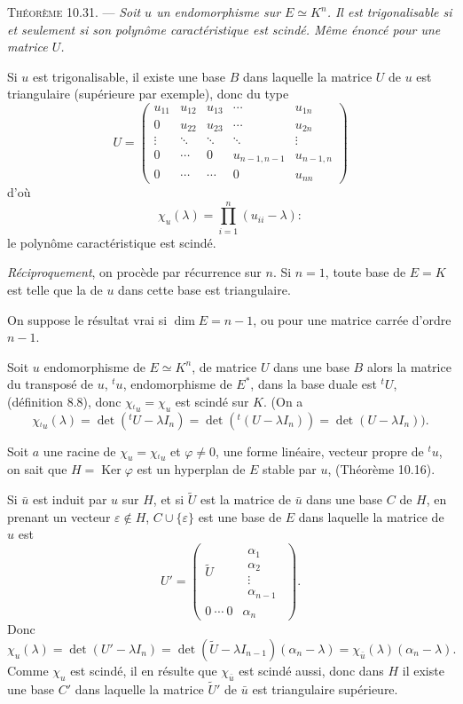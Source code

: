 \medskip\noindent\textsc{Théorème 10.31.} --- \emph{Soit $u$ un endomorphisme sur $E\simeq K^n$. Il est trigonalisable si et seulement si son polynôme caractéristique est scindé. Même énoncé pour une matrice $U$.}

Si $u$ est trigonalisable, il existe une base $B$ dans laquelle la matrice $U$ de $u$ est triangulaire (supérieure par exemple), donc du type
\[
U=
\begin{pmatrix}
u_{11}&u_{12}&u_{13}&\cdots&u_{1n}\\
0&u_{22}&u_{23}&\cdots&u_{2n}\\
\vdots&\ddots&\ddots&\ddots&\vdots\\
0&\cdots&0&u_{n-1,n-1}&u_{n-1,n}\\
0&\cdots&\cdots&0&u_{nn}
\end{pmatrix}
\]
d'où
\[
\chi_u(\lambda)=\prod_{i=1}^n(u_{ii}-\lambda):
\]
le polynôme caractéristique est scindé.

\emph{Réciproquement}, on procède par récurrence sur $n$. Si $n=1$, toute base de $E=K$ est telle que la  de $u$ dans cette base est triangulaire.

On suppose le résultat vrai si $\dim E=n-1$, ou pour une matrice carrée d'ordre $n-1$.

Soit $u$ endomorphisme de $E\simeq K^n$, de matrice $U$ dans une base $B$ alors la matrice du transposé de $u$, ${}^tu$, endomorphisme de $E^*$, dans la base duale est ${}^tU$, (définition 8.8), donc $\chi_{{}^tu}=\chi_u$ est scindé sur $K$. (On a
\[
\chi_{{}^tu}(\lambda)=\det({}^tU-\lambda I_n)=\det({}^t(U-\lambda I_n))=\det(U-\lambda I_n)).
\]

Soit $a$ une racine de $\chi_u=\chi_{{}^tu}$ et $\varphi\ne0$, une forme linéaire, vecteur propre de ${}^tu$, on sait que $H=\operatorname{Ker}\varphi$ est un hyperplan de $E$ stable par $u$, (Théorème 10.16).

Si $\bar u$ est induit par $u$ sur $H$, et si $\widetilde U$ est la matrice de $\bar u$ dans une base $C$ de $H$, en prenant un vecteur $\varepsilon\notin H$, $C\cup\{\varepsilon\}$ est une base de $E$ dans laquelle la matrice de $u$ est
\[
U'=
\begin{pmatrix}
\widetilde U&\begin{matrix}\alpha_1\\\alpha_2\\\vdots\\\alpha_{n-1}\end{matrix}\\
0\ \cdots\ 0&\alpha_n
\end{pmatrix}.
\]
Donc
\[
\chi_u(\lambda)=\det(U'-\lambda I_n)
=\det(\widetilde U-\lambda I_{n-1})(\alpha_n-\lambda)
=\chi_{\bar u}(\lambda)(\alpha_n-\lambda).
\]
Comme $\chi_u$ est scindé, il en résulte que $\chi_{\bar u}$ est scindé aussi, donc dans $H$ il existe une base $C'$ dans laquelle la matrice $\widetilde U'$ de $\bar u$ est triangulaire supérieure.

